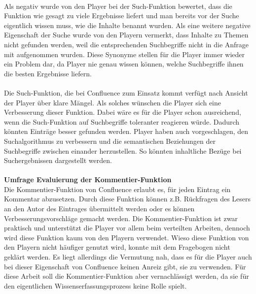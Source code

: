 \documentclass[a4paper,12pt]{scrartcl}
\begin{document}
\\
Als negativ wurde von den Player bei der Such-Funktion bewertet, dass die Funktion wie gesagt zu viele Ergebnisse liefert und man bereits vor der Suche eigentlich wissen muss, wie die Inhalte benannt wurden. Als eine weitere negative Eigenschaft der Suche wurde von den Playern vermerkt, dass Inhalte zu Themen nicht gefunden werden, weil die entsprechenden Suchbegriffe nicht in die Anfrage mit aufgenommen wurden. Diese Synonyme stellen für die Player immer wieder ein Problem dar, da Player nie genau wissen können, welche Suchbegriffe ihnen die besten Ergebnisse liefern. 
\\\\
Die Such-Funktion, die bei Confluence zum Einsatz kommt verfügt nach Ansicht der Player über klare Mängel. Als solches wünschen die Player sich eine Verbesserung dieser Funktion. Dabei wäre es für die Player schon ausreichend, wenn die Such-Funktion auf Suchbegriffe toleranter reagieren würde. Dadurch könnten Einträge besser gefunden werden. Player haben auch vorgeschlagen, den Suchalgorithmus zu verbessern und die semantischen Beziehungen der Suchbegriffe zwischen einander herzustellen. So könnten inhaltliche Bezüge bei Suchergebnissen dargestellt werden.
\\\\
\textbf{Umfrage Evaluierung der Kommentier-Funktion}\\
Die Kommentier-Funktion von Confluence erlaubt es, für jeden Eintrag ein Kommentar abzusetzen. Durch diese Funktion können z.B. Rückfragen des Lesers an den Autor des Eintrages übermittelt werden oder es können Verbesserungsvorschläge gemacht werden. Die Kommentier-Funktion ist zwar praktisch und unterstützt die Player vor allem beim verteilten Arbeiten, dennoch wird diese Funktion kaum von den Playern verwendet. Wieso diese Funktion von den Playern nicht häufiger genutzt wird, konnte mit dem Fragebogen nicht geklärt werden. Es liegt allerdings die Vermutung nah, dass es für die Player auch bei dieser Eigenschaft von Confluence keinen Anreiz gibt, sie zu verwenden. Für diese Arbeit soll die Kommentier-Funktion aber vernachlässigt werden, da sie für den eigentlichen Wissenserfassungsprozess keine Rolle spielt.
\end{document}
